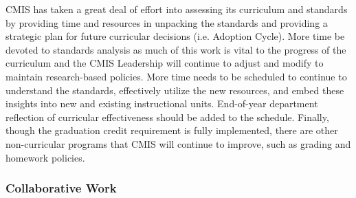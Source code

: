 \begin{findings}

CMIS has taken a great deal of effort into assessing its curriculum and standards by providing time and resources in unpacking the standards and providing a strategic plan for future curricular decisions (i.e. Adoption Cycle). More time be devoted to standards analysis as much of this work is vital to the progress of the curriculum and the CMIS Leadership will continue to adjust and modify to maintain research-based policies. More time needs to be scheduled to continue to understand the standards, effectively utilize the new resources, and embed these insights into new and existing instructional units. End-of-year department reflection of curricular effectiveness should be added to the schedule. Finally, though the graduation credit requirement is fully implemented, there are other non-curricular programs that CMIS will continue to improve, such as grading and homework policies.
\end{findings}

\subsubsection{Collaborative Work}



